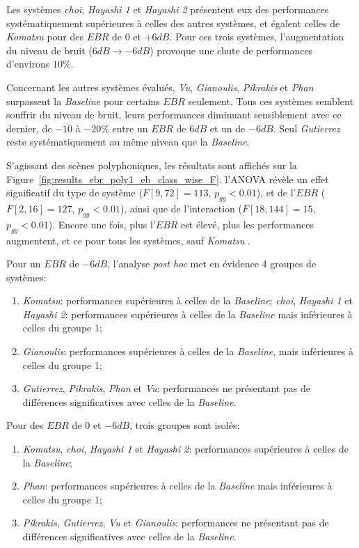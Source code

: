 Les systèmes \emph{choi}, \emph{Hayashi 1} et \emph{Hayashi 2} présentent eux des performances systématiquement supérieures à celles des autres systèmes, et égalent celles de \emph{Komatsu} pour des $EBR$ de $0$ et $+6dB$. Pour ces trois systèmes, l'augmentation du niveau de bruit ($6dB\rightarrow -6dB$) provoque une chute de performances d'environs $10\%$.

Concernant les autres systèmes évalués, \emph{Vu}, \emph{Gianoulis}, \emph{Pikrakis} et \emph{Phan} surpassent la \emph{Baseline} pour certains $EBR$ seulement. Tous ces systèmes semblent souffrir du niveau de bruit, leurs performances diminuant sensiblement avec ce dernier, de $-10$ à $-20\%$ entre un $EBR$ de $6dB$ et un de $-6dB$. Seul \emph{Gutierrez} reste systématiquement au même niveau que la \emph{Baseline}.

S'agissant des scènes polyphoniques, les résultats sont affichés sur la Figure~\ref{fig:results_ebr_poly1_eb_class_wise_F}. l'ANOVA révèle un effet significatif du type de système ($F[9,72]=113$, $p_{gg}<0.01$), et de l'$EBR$ ($F[2,16]=127$, $p_{gg}<0.01$), ainsi que de l'interaction ($F[18,144]=15$, $p_{gg}<0.01$). Encore une fois, plus l'$EBR$ est élevé, plus les performances augmentent, et ce pour tous les systèmes, sauf \emph{Komatsu} .

Pour un $EBR$ de $-6dB$, l'analyse \emph{post hoc} met en évidence 4 groupes de systèmes:

\begin{enumerate}
\item \emph{Komatsu}: performances supérieures à celles de la \emph{Baseline};
\emph{choi}, \emph{Hayashi 1} et \emph{Hayashi 2}: performances supérieures à celles de la \emph{Baseline} mais inférieures à celles du groupe 1;
\item \emph{Gianoulis}: performances supérieures à celles de la \emph{Baseline}, mais inférieures à celles du groupe 1;
\item \emph{Gutierrez}, \emph{Pikrakis}, \emph{Phan} et \emph{Vu}: performances ne présentant pas de différences significatives avec celles de la \emph{Baseline}.
\end{enumerate}

Pour des $EBR$ de $0$ et $-6dB$, trois groupes sont isolés: 

\begin{enumerate}
\item \emph{Komatsu}, \emph{choi}, \emph{Hayashi 1} et \emph{Hayashi 2}: performances supérieures à celles de la \emph{Baseline};
\item \emph{Phan}: performances supérieures à celles de la \emph{Baseline} mais inférieures à celles du groupe 1;
\item \emph{Pikrakis}, \emph{Gutierrez}, \emph{Vu} et \emph{Gianoulis}: performances ne présentant pas de différences significatives avec celles de la \emph{Baseline}.
\end{enumerate}

